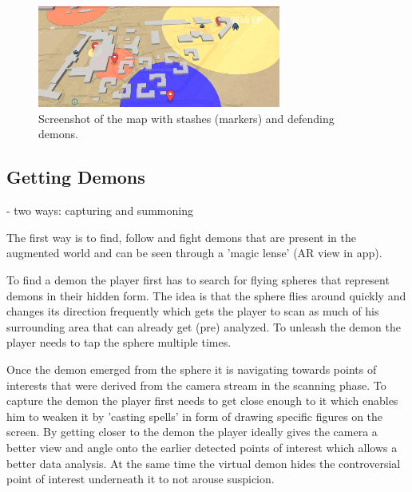 \begin{figure}
    \includegraphics[width=8cm]{graphics/map.png}
    \caption{Screenshot of the map with stashes (markers) and defending demons.}
    \label{fig:map}
\end{figure}




\subsection{Getting Demons}
\label{subsec:demons}

- two ways: capturing and summoning

The first way is to find, follow and fight demons that are present in the augmented world and can be seen through a 'magic lense' (AR view in app).

To find a demon the player first has to search for flying spheres that represent demons in their hidden form. 
The idea is that the sphere flies around quickly and changes its direction frequently which gets the player to scan as much of his surrounding area that can already get (pre) analyzed.
To unleash the demon the player needs to tap the sphere multiple times. 

Once the demon emerged from the sphere it is navigating towards points of interests that were derived from the camera stream in the scanning phase.
To capture the demon the player first needs to get close enough to it which enables him to weaken it by 'casting spells' in form of drawing specific figures on the screen. 
By getting closer to the demon the player ideally gives the camera a better view and angle onto the earlier detected points of interest which allows a better data analysis. 
At the same time the virtual demon hides the controversial point of interest underneath it to not arouse suspicion. 


